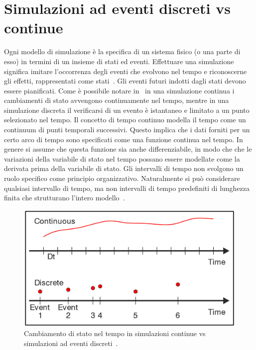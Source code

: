 \documentclass[12pt,a4paper,openright,twoside]{book}
\begin{document}
\section{Simulazioni ad eventi discreti vs continue}
Ogni modello di simulazione è la specifica di un sistema fisico (o una parte di esso) in termini di un insieme di stati ed eventi. 
Effettuare una simulazione significa imitare l'occorrenza degli eventi che evolvono nel tempo e riconoscerne gli effetti, rappresentati come stati~\cite{PDES}. 
Gli eventi futuri indotti dagli stati devono essere pianificati. Come è possibile notare in~ in una simulazione continua i cambiamenti di stato avvengono continuamente nel tempo, mentre in una simulazione discreta il verificarsi di un evento è istantaneo e limitato a un punto selezionato nel tempo. 
Il concetto di tempo continuo modella il tempo come un continuum di punti temporali successivi. Questo implica che i dati forniti per un certo arco di tempo sono specificati come una funzione continua nel tempo. In genere si assume che questa funzione sia anche differenziabile, in modo che che le variazioni della variabile di stato nel tempo possano essere modellate come la derivata prima della variabile di stato. Gli intervalli di tempo non svolgono un ruolo specifico come principio organizzativo. Naturalmente si può considerare qualsiasi intervallo di tempo, ma non intervalli di tempo predefiniti di lunghezza finita che strutturano l'intero modello~\cite{Ossimitz2008TheBO}. 
\begin{figure}
    \centering
    \includegraphics[width=.8\linewidth]{figures/discrete-event-simulation/Discrete-vs-Continuous-Simulation.png}
    \caption{Cambiamento di stato nel tempo in simulazioni continue vs simulazioni ad eventi discreti~\cite{Helal2008AHS}.}
    \label{fig:Continuous-vs-Discrete}
\end{figure}
\end{document}
